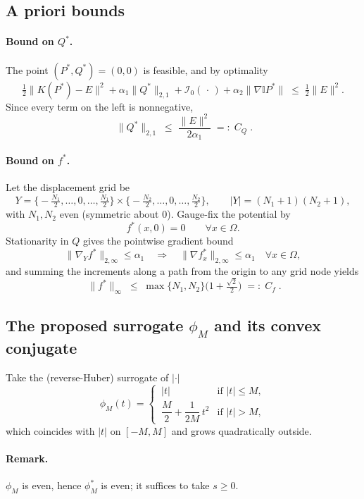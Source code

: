 \documentclass{article}
\begin{document}
\subsection*{A priori bounds}

\paragraph{Bound on $Q^{*}$.}
The point $(P^{*},Q^{*})=(0,0)$ is feasible, and by optimality
$$
\tfrac{1}{2}\|K(P^{*})-E\|^{2} + \alpha_1\|Q^{*}\|_{2,1}
+ \mathcal{I}_0(\,\cdot\,) + \alpha_2\|\nabla\mathbb{I}P^{*}\|
\;\le\; \tfrac{1}{2}\|E\|^{2}.
$$
Since every term on the left is nonnegative,
$$
\boxed{\;\|Q^{*}\|_{2,1}\;\le\;\frac{\|E\|^{2}}{2\alpha_1}\;=:\;C_Q\;}.
$$

\paragraph{Bound on $f^{*}$.}
Let the displacement grid be
$$
Y=\Big\{-\tfrac{N_1}{2},\dots,0,\dots,\tfrac{N_1}{2}\Big\}\times\Big\{-\tfrac{N_2}{2},\dots,0,\dots,\tfrac{N_2}{2}\Big\},
\qquad |Y|=(N_1+1)(N_2+1),
$$
with $N_1,N_2$ even (symmetric about $0$). Gauge-fix the potential by
$$
f^{*}(x,0)=0 \qquad \forall x\in\Omega .
$$
Stationarity in $Q$ gives the pointwise gradient bound
$$
\|\nabla_Y f^{*}\|_{2,\infty}\le\alpha_1
\quad\Longrightarrow\quad
\|\nabla f^{*}_x\|_{2,\infty}\le\alpha_1 \quad \forall x\in\Omega,
$$
and summing the increments along a path from the origin to any grid node yields
$$
\boxed{\;\|f^{*}\|_\infty\;\le\;\max\{N_1,N_2\}\Big(1+\tfrac{\sqrt{2}}{2}\Big)\;=:\;C_f\;}.
$$

\subsection*{The proposed surrogate $\phi_M$ and its convex conjugate}

Take the (reverse-Huber) surrogate of $|\cdot|$
$$
\phi_M(t)=
\begin{cases}
\,|t| & \text{if } |t|\le M,\\[4pt]
\,\dfrac{M}{2}+\dfrac{1}{2M}\,t^{2} & \text{if } |t|> M,
\end{cases}
$$
which coincides with $|t|$ on $[-M,M]$ and grows quadratically outside.

\paragraph{Remark.} $\phi_M$ is even, hence $\phi_M^{*}$ is even; it suffices to take $s\ge 0$.
\end{document}
